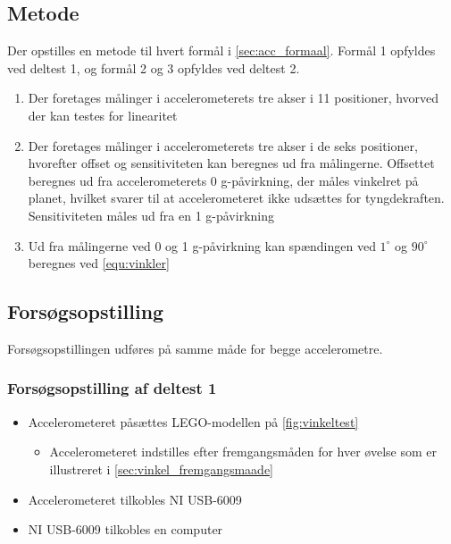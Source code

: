 \subsection{Metode}
Der opstilles en metode til hvert formål i \autoref{sec:acc_formaal}. Formål 1 opfyldes ved deltest 1, og formål 2 og 3 opfyldes ved deltest 2. 
\begin{enumerate}
\item Der foretages målinger i accelerometerets tre akser i 11 positioner, hvorved der kan testes for linearitet
\item Der foretages målinger i accelerometerets tre akser i de seks positioner, hvorefter offset og sensitiviteten kan beregnes ud fra målingerne. Offsettet beregnes ud fra accelerometerets 0 g-påvirkning, der måles vinkelret på planet, hvilket svarer til at accelerometeret ikke udsættes for tyngdekraften. Sensitiviteten måles ud fra en 1 g-påvirkning
\item Ud fra målingerne ved 0 og 1 g-påvirkning kan spændingen ved $1^{\circ}$ og $90^{\circ}$ beregnes ved \autoref{equ:vinkler}
\end{enumerate}

\subsection{Forsøgsopstilling}
Forsøgsopstillingen udføres på samme måde for begge accelerometre.

\subsubsection{Forsøgsopstilling af deltest 1}
\begin{itemize}
\item Accelerometeret påsættes LEGO-modellen på \autoref{fig:vinkeltest}
\begin{itemize}
\item Accelerometeret indstilles efter fremgangsmåden for hver øvelse som er illustreret i \autoref{sec:vinkel_fremgangsmaade}
\end{itemize}
\item Accelerometeret tilkobles NI USB-6009
\item NI USB-6009 tilkobles en computer
\end{itemize}

